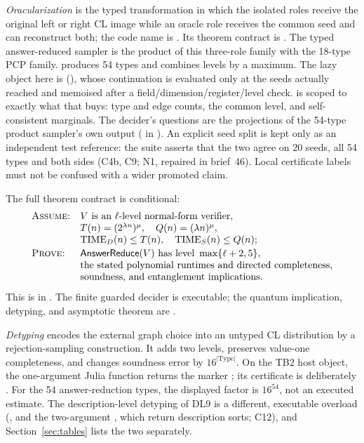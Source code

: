 \emph{Oracularization} is the typed transformation in which the isolated
roles receive the original left or right CL image while an oracle role receives
the common seed and can reconstruct both; the code name is
.  Its theorem contract is .
The typed
answer-reduced sampler is the product of this three-role family with the
18-type PCP family.   produces 54 types and
combines levels by a maximum.  The lazy object here is 
(), whose  continuation is evaluated only
at the seeds actually reached and memoised after a field/dimension/register/level
check.   is scoped to exactly what that buys: type and edge
counts, the common level, and self-consistent marginals.  The decider's
questions are the projections of the 54-type product sampler's own
 output ( in
).  An explicit seed split is kept only as
an independent test reference: the suite asserts that the two agree on 20
seeds, all 54 types and both sides (C4b, C9;  N1,
repaired in brief~46).  Local
certificate labels must not be confused with a wider promoted claim.

The full theorem contract is conditional:
\[
\begin{array}{ll}
\textsc{Assume:}&V\text{ is an }\ell\text{-level normal-form verifier},\\
&T(n)=(2^{\lambda n})^\mu,\quad Q(n)=(\lambda n)^\mu,\\
&\operatorname{TIME}_D(n)\leq T(n),\quad \operatorname{TIME}_S(n)\leq Q(n);\\[2pt]
\textsc{Prove:}&\mathsf{AnswerReduce}(V)\text{ has level }\max\{\ell+2,5\},\\
&\text{the stated polynomial runtimes and directed completeness,}\\
&\text{soundness, and entanglement implications.}
\end{array}
\]
This is  in
.  The finite guarded decider is
executable; the quantum implication, detyping, and asymptotic theorem are
.

\emph{Detyping} encodes the external graph choice into an untyped CL
distribution by a rejection-sampling construction.  It adds two levels,
preserves value-one completeness, and changes soundness error by
\(16^{|\mathrm{Type}|}\).
On the TB2 host object, the one-argument Julia function  returns
the marker ; its certificate is deliberately
.  For the 54 answer-reduction types, the displayed factor is
\(16^{54}\), not an executed estimate.  The description-level detyping of DL9
is a different, executable overload (,
 and the two-argument , which return
description sorts; C12), and Section~\ref{sec:tables} lists the two
separately.

